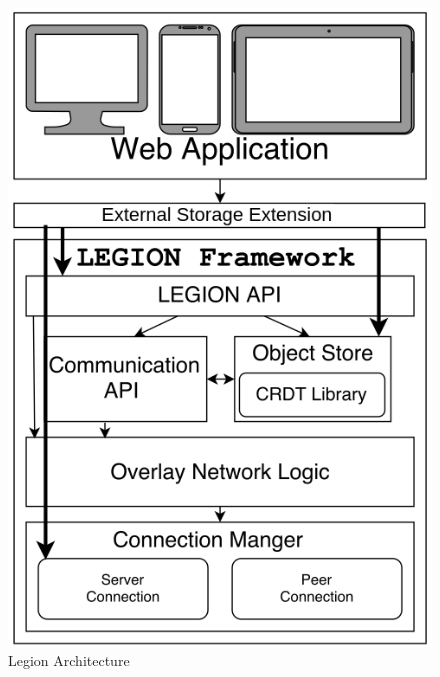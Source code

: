 \begin{figure}[H]
\centering
\includegraphics[scale=0.3]{files/legionArchitecture.png}
\caption{Legion Architecture}
\label{legion_architecture}
\end{figure}

